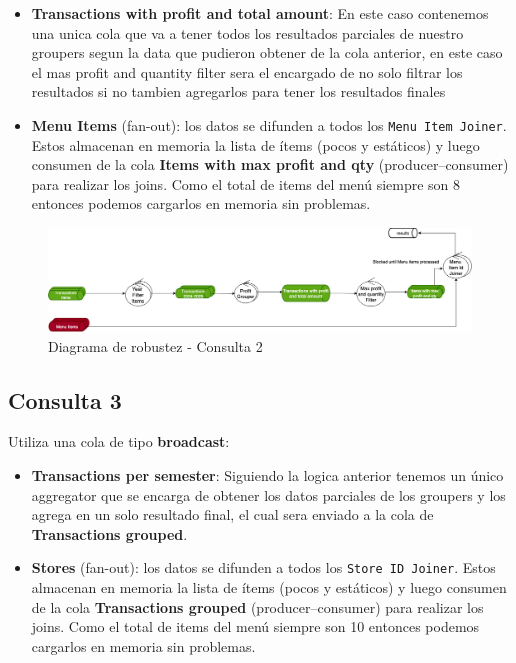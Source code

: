 \documentclass[titlepage,a4paper]{article}
\begin{document}
\begin{itemize}
    \item \textbf{Transactions with profit and total amount}: En este caso contenemos una unica cola que va a tener todos los resultados parciales de nuestro groupers segun la data que pudieron obtener de la cola anterior, en este caso el mas profit and quantity filter sera el encargado de no solo filtrar los resultados si no tambien agregarlos para tener los resultados finales
    \item \textbf{Menu Items} (fan-out): los datos se difunden a todos los \texttt{Menu Item Joiner}. Estos almacenan en memoria la lista de ítems (pocos y estáticos) y luego consumen de la cola \textbf{Items with max profit and qty} (producer--consumer) para realizar los joins. Como el total de items del menú siempre son 8 entonces podemos cargarlos en memoria sin problemas.
\end{itemize}

\begin{figure}[H]
    \centering
    \includegraphics[width=1.0\textwidth]{consulta2.png}
    \caption{Diagrama de robustez - Consulta 2}
\end{figure}

\subsection*{Consulta 3}
Utiliza una cola de tipo \textbf{broadcast}:

\begin{itemize}
    \item \textbf{Transactions per semester}: Siguiendo la logica anterior tenemos un único aggregator que se encarga de obtener los datos parciales de los groupers y los agrega en un solo resultado final, el cual sera enviado a la cola de \textbf{Transactions grouped}.
    \item \textbf{Stores} (fan-out): los datos se difunden a todos los \texttt{Store ID Joiner}. Estos almacenan en memoria la lista de ítems (pocos y estáticos) y luego consumen de la cola \textbf{Transactions grouped} (producer--consumer) para realizar los joins. Como el total de items del menú siempre son 10 entonces podemos cargarlos en memoria sin problemas.
\end{itemize}
\end{document}
